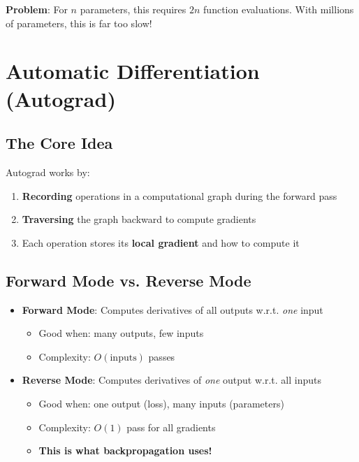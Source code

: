 \textbf{Problem}: For $n$ parameters, this requires $2n$ function evaluations. With millions of parameters, this is far too slow!

\section{Automatic Differentiation (Autograd)}

\subsection{The Core Idea}

Autograd works by:
\begin{enumerate}
    \item \textbf{Recording} operations in a computational graph during the forward pass
    \item \textbf{Traversing} the graph backward to compute gradients
    \item Each operation stores its \textbf{local gradient} and how to compute it
\end{enumerate}

\subsection{Forward Mode vs. Reverse Mode}

\begin{itemize}
    \item \textbf{Forward Mode}: Computes derivatives of all outputs w.r.t. \textit{one} input
    \begin{itemize}
        \item Good when: many outputs, few inputs
        \item Complexity: $O(\text{inputs})$ passes
    \end{itemize}
    
    \item \textbf{Reverse Mode}: Computes derivatives of \textit{one} output w.r.t. all inputs
    \begin{itemize}
        \item Good when: one output (loss), many inputs (parameters)
        \item Complexity: $O(1)$ pass for all gradients
        \item \textbf{This is what backpropagation uses!}
    \end{itemize}
\end{itemize}

